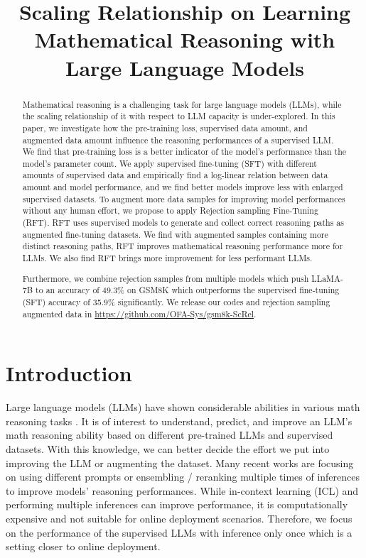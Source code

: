 \title{Scaling Relationship on Learning Mathematical Reasoning with Large Language Models}

\begin{abstract}
Mathematical reasoning is a challenging task for large language models (LLMs), while the scaling relationship of it with respect to LLM capacity is under-explored. In this paper, we investigate how the pre-training loss, supervised data amount, and augmented data amount influence the reasoning performances of a supervised LLM. We find that pre-training loss is a better indicator of the model's performance than the model's parameter count. We apply supervised fine-tuning (SFT) with different amounts of supervised data and empirically find a log-linear relation between data amount and model performance, and we find better models improve less with enlarged supervised datasets. To augment more data samples for improving model performances without any human effort, we propose to apply Rejection sampling Fine-Tuning (RFT). RFT uses supervised models to generate and collect correct reasoning paths as augmented fine-tuning datasets. We find with augmented samples containing more distinct reasoning paths, RFT improves mathematical reasoning performance more for LLMs. We also find RFT brings more improvement for less performant LLMs.

Furthermore, we combine rejection samples from multiple models which push LLaMA-7B to an accuracy of 49.3\% on GSM8K which outperforms the supervised fine-tuning (SFT) accuracy of 35.9\% significantly. We release our codes and rejection sampling augmented data in \url{https://github.com/OFA-Sys/gsm8k-ScRel}.
\end{abstract}

\section{Introduction}

Large language models (LLMs) \citep{anil2023palm,llama2,gpt4} have shown considerable abilities in various math reasoning tasks \citep{saxton2019analysing,gsm8k,lightman2023lets}. It is of interest to understand, predict, and improve an LLM's math reasoning ability based on different pre-trained LLMs and supervised datasets. With this knowledge, we can better decide the effort we put into improving the LLM or augmenting the dataset. Many recent works are focusing on using different prompts \citep{Wei2022ChainOT,yao2023tree} or ensembling / reranking multiple times of inferences \citep{gsm8k,uesato2022solving,wang2023selfconsistency,lightman2023lets} to improve models' reasoning performances. While in-context learning (ICL) and performing multiple inferences can improve performance, it is computationally expensive and not suitable for online deployment scenarios. Therefore, we focus on the performance of the supervised LLMs with inference only once which is a setting closer to online deployment.

